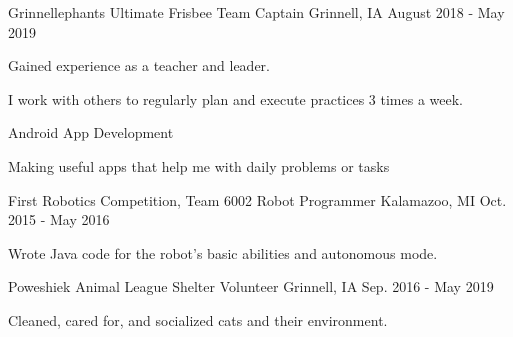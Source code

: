 \documentclass[12pt, a4paper]{awesome-cv}
\begin{document}
\begin{cventries}
  \cventry
    {Grinnellephants Ultimate Frisbee}
    {Team Captain}
    {Grinnell, IA}
    {August 2018 - May 2019}
    {
      \begin{cvitems}
        \item {Gained experience as a teacher and leader.}
        \item {I work with others to regularly plan and execute practices 3 times a week.}
      \end{cvitems}
    }

    \cventry
      {}
      {Android App Development}
      {}
      {}
      {
        \begin{cvitems}
          \item {Making useful apps that help me with daily problems or tasks}
        \end{cvitems}
      }

  \cventry
    {First Robotics Competition, Team 6002}
    {Robot Programmer}
    {Kalamazoo, MI}
    {Oct. 2015 - May 2016}
    {
      \begin{cvitems}
        \item {Wrote Java code for the robot’s basic abilities and autonomous mode.}
      \end{cvitems}
    }

  \cventry
    {Poweshiek Animal League Shelter}
    {Volunteer}
    {Grinnell, IA}
    {Sep. 2016 - May 2019}
    {
      \begin{cvitems}
        \item {Cleaned, cared for, and socialized cats and their environment.}
      \end{cvitems}
    }

\end{cventries}
\end{document}
